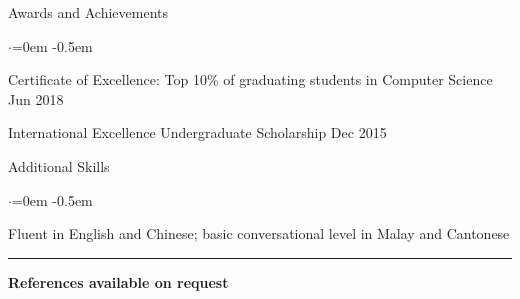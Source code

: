 \documentclass{techresume} %
\begin{document}

\begin{rSection}{Awards and Achievements}

\begin{list}{$\cdot$}{\leftmargin=0em}
\itemsep -0.5em
\item Certificate of Excellence: Top 10\% of graduating students in Computer Science \hfill Jun 2018
\item International Excellence Undergraduate Scholarship \hfill Dec 2015
\end{list}

\end{rSection}


\begin{rSection}{Additional Skills}

\begin{list}{$\cdot$}{\leftmargin=0em}
\itemsep -0.5em
\item Fluent in English and Chinese; basic conversational level in Malay and Cantonese
\end{list}

\end{rSection}


\sectionskip
\sectionlineskip
\hrule
{\bf References available on request}
\end{document}
